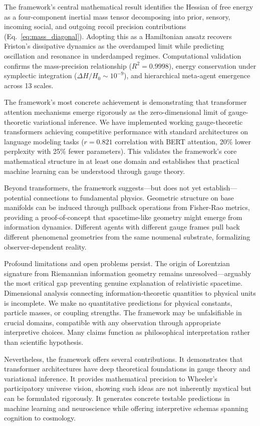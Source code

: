\documentclass[11pt]{article}
\begin{document}
The framework's central mathematical result identifies the Hessian of free energy as a four-component inertial mass tensor decomposing into prior, sensory, incoming social, and outgoing recoil precision contributions (Eq.~\ref{eq:mass_diagonal}). Adopting this as a Hamiltonian ansatz recovers Friston's dissipative dynamics as the overdamped limit while predicting oscillation and resonance in underdamped regimes. Computational validation confirms the mass-precision relationship ($R^2 = 0.9998$), energy conservation under symplectic integration ($\Delta H/H_0 \sim 10^{-9}$), and hierarchical meta-agent emergence across 13 scales.

The framework's most concrete achievement is demonstrating that transformer attention mechanisms emerge rigorously as the zero-dimensional limit of gauge-theoretic variational inference. We have implemented working gauge-theoretic transformers achieving competitive performance with standard architectures on language modeling tasks ($r = 0.821$ correlation with BERT attention, 20\% lower perplexity with 25\% fewer parameters). This validates the framework's core mathematical structure in at least one domain and establishes that practical machine learning can be understood through gauge theory.

Beyond transformers, the framework suggests---but does not yet establish---potential connections to fundamental physics. Geometric structure on base manifolds can be induced through pullback operations from Fisher-Rao metrics, providing a proof-of-concept that spacetime-like geometry might emerge from information dynamics. Different agents with different gauge frames pull back different phenomenal geometries from the same noumenal substrate, formalizing observer-dependent reality.

Profound limitations and open problems persist. The origin of Lorentzian signature from Riemannian information geometry remains unresolved---arguably the most critical gap preventing genuine explanation of relativistic spacetime. Dimensional analysis connecting information-theoretic quantities to physical units is incomplete. We make no quantitative predictions for physical constants, particle masses, or coupling strengths. The framework may be unfalsifiable in crucial domains, compatible with any observation through appropriate interpretive choices. Many claims function as philosophical interpretation rather than scientific hypothesis.

Nevertheless, the framework offers several contributions. It demonstrates that transformer architectures have deep theoretical foundations in gauge theory and variational inference. It provides mathematical precision to Wheeler's participatory universe vision, showing such ideas are not inherently mystical but can be formulated rigorously. It generates concrete testable predictions in machine learning and neuroscience while offering interpretive schemas spanning cognition to cosmology.
\end{document}
